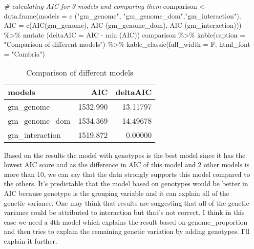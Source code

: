 \documentclass[
]{article}
\newenvironment{Shaded}{\begin{snugshade}}{\end{snugshade}}
\newcommand{\AttributeTok}[1]{\textcolor[rgb]{0.77,0.63,0.00}{#1}}
\newcommand{\CommentTok}[1]{\textcolor[rgb]{0.56,0.35,0.01}{\textit{#1}}}
\newcommand{\FunctionTok}[1]{\textcolor[rgb]{0.00,0.00,0.00}{#1}}
\newcommand{\NormalTok}[1]{#1}
\newcommand{\OtherTok}[1]{\textcolor[rgb]{0.56,0.35,0.01}{#1}}
\newcommand{\SpecialCharTok}[1]{\textcolor[rgb]{0.00,0.00,0.00}{#1}}
\newcommand{\StringTok}[1]{\textcolor[rgb]{0.31,0.60,0.02}{#1}}
\begin{document}
\begin{Shaded}
\begin{Highlighting}[]
\CommentTok{\# calculating AIC for 3 models and comparing them }
\NormalTok{comparison }\OtherTok{\textless{}{-}} \FunctionTok{data.frame}\NormalTok{(}\AttributeTok{models  =} \FunctionTok{c}\NormalTok{ (}\StringTok{"gm\_genome"}\NormalTok{, }\StringTok{"gm\_genome\_dom"}\NormalTok{,}\StringTok{"gm\_interaction"}\NormalTok{),}
                         \AttributeTok{AIC =} \FunctionTok{c}\NormalTok{(}\FunctionTok{AIC}\NormalTok{(gm\_genome), }\FunctionTok{AIC}\NormalTok{ (gm\_genome\_dom), }\FunctionTok{AIC}\NormalTok{ (gm\_interaction))) }\SpecialCharTok{\%\textgreater{}\%} 
  \FunctionTok{mutate}\NormalTok{ (}\AttributeTok{deltaAIC =}\NormalTok{ AIC }\SpecialCharTok{{-}} \FunctionTok{min}\NormalTok{ (AIC))}
\NormalTok{comparison }\SpecialCharTok{\%\textgreater{}\%}   \FunctionTok{kable}\NormalTok{(}\AttributeTok{caption =} \StringTok{"Comparison of different models"}\NormalTok{) }\SpecialCharTok{\%\textgreater{}\%} 
  \FunctionTok{kable\_classic}\NormalTok{(}\AttributeTok{full\_width =}\NormalTok{ F, }\AttributeTok{html\_font =} \StringTok{"Cambria"}\NormalTok{)}
\end{Highlighting}
\end{Shaded}

\begin{table}

\caption{\label{tab:unnamed-chunk-7}Comparison of different models}
\centering
\begin{tabular}[t]{l|r|r}
\hline
models & AIC & deltaAIC\\
\hline
gm\_genome & 1532.990 & 13.11797\\
\hline
gm\_genome\_dom & 1534.369 & 14.49678\\
\hline
gm\_interaction & 1519.872 & 0.00000\\
\hline
\end{tabular}
\end{table}

Based on the results the model with genotypes is the best model since it
has the lowest AIC score and as the difference in AIC of this model and
2 other models is more than 10, we can say that the data strongly
supports this model compared to the others. It's predictable that the
model based on genotypes would be better in AIC because genotype is the
grouping variable and it can explain all of the genetic variance. One
may think that results are suggesting that all of the genetic variance
could be attributed to interaction but that's not correct. I think in
this case we need a 4th model which explains the result based on
genome\_proportion and then tries to explain the remaining genetic
variation by adding genotypes. I'll explain it further.
\end{document}
